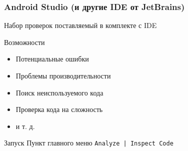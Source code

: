 \documentclass{beamer}
\begin{document}
\begin{frame}
    \frametitle{Android Studio (и другие IDE от JetBrains)}
    Набор проверок поставляемый в комплекте с IDE
    \begin{block}{Возможности}
        \begin{itemize}
            \item{Потенциальные ошибки}
            \item{Проблемы производительности}
            \item{Поиск неиспользуемого кода}
            \item{Проверка кода на сложность}
            \item{и т. д.}
        \end{itemize}
    \end{block}
    \begin{block}{Запуск}
        Пункт главного меню \texttt{Analyze | Inspect Code}
    \end{block}
\end{frame}
\end{document}
